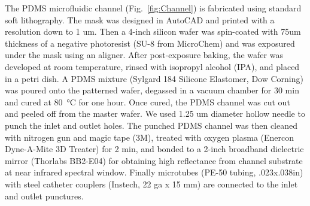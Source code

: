 \documentclass[aps,pra,reprint,superscriptaddress]{revtex4-1}
\begin{document}
The PDMS microfluidic channel (Fig.~\ref{fig:Channel}) is fabricated using standard soft lithography. The mask was designed in AutoCAD and printed with a resolution down to 1 um. Then a 4-inch silicon wafer was spin-coated with 75um thickness of a negative photoresist (SU-8 from MicroChem) and was exposured under the mask using an aligner. After post-exposure baking, the wafer was developed at room temperature, rinsed with isopropyl alcohol (IPA), and placed in a petri dish.  A PDMS mixture (Sylgard 184 Silicone Elastomer, Dow Corning) was poured onto the patterned wafer, degassed in a vacuum chamber for 30 min and cured at \SI{80}{\degreeCelsius} for one hour. Once cured, the PDMS channel was cut out and peeled off from the master wafer. We used 1.25 um diameter hollow needle to punch the inlet and outlet holes. 
The punched PDMS channel was then cleaned with nitrogen gun and magic tape (3M), treated with oxygen plasma (Enercon Dyne-A-Mite 3D Treater) for 2 min, and bonded to a 2-inch broadband dielectric mirror (Thorlabs BB2-E04) for obtaining high reflectance from channel substrate at near infrared spectral window. Finally microtubes (PE-50 tubing, .023x.038in) with steel catheter couplers (Instech, 22 ga x 15 mm) are connected to the inlet and outlet punctures.
\end{document}
